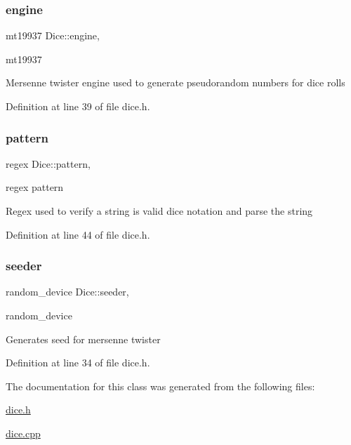 \subsubsection{\texorpdfstring{engine}{engine}}
{\footnotesize\ttfamily mt19937 Dice\+::engine\hspace{0.3cm}{\ttfamily [static]}, {\ttfamily [private]}}

mt19937

Mersenne twister engine used to generate pseudorandom numbers for dice rolls 

Definition at line 39 of file dice.\+h.

\hypertarget{class_dice_aed565a295973cdcc36921307ff4133b0}{}\label{class_dice_aed565a295973cdcc36921307ff4133b0} 
\subsubsection{\texorpdfstring{pattern}{pattern}}
{\footnotesize\ttfamily regex Dice\+::pattern\hspace{0.3cm}{\ttfamily [static]}, {\ttfamily [private]}}

regex pattern

Regex used to verify a string is valid dice notation and parse the string 

Definition at line 44 of file dice.\+h.

\hypertarget{class_dice_af481058183b404432e1f0e44ac2edda7}{}\label{class_dice_af481058183b404432e1f0e44ac2edda7} 
\subsubsection{\texorpdfstring{seeder}{seeder}}
{\footnotesize\ttfamily random\+\_\+device Dice\+::seeder\hspace{0.3cm}{\ttfamily [static]}, {\ttfamily [private]}}

random\+\_\+device

Generates seed for mersenne twister 

Definition at line 34 of file dice.\+h.



The documentation for this class was generated from the following files\+:\begin{DoxyCompactItemize}
\item 
\hyperlink{dice_8h}{dice.\+h}\item 
\hyperlink{dice_8cpp}{dice.\+cpp}\end{DoxyCompactItemize}
